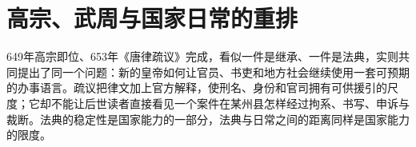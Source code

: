 \section{高宗、武周与国家日常的重排} \label{sec:gao-zong-wu-zhou-domestic-order}  649年高宗即位、653年《唐律疏议》完成，看似一件是继承、一件是法典，实则共同提出了同一个问题：新的皇帝如何让官员、书吏和地方社会继续使用一套可预期的办事语言。疏议把律文加上官方解释，使刑名、身份和官司拥有可供援引的尺度；它却不能让后世读者直接看见一个案件在某州县怎样经过拘系、书写、申诉与裁断。法典的稳定性是国家能力的一部分，法典与日常之间的距离同样是国家能力的限度。%